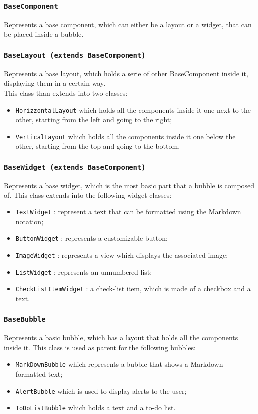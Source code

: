 \subsubsection{\texttt{BaseComponent}}
Represents a base component, which can either be a layout or a widget, that can be placed inside a bubble.

\subsubsection{\texttt{BaseLayout (extends BaseComponent)}}
Represents a base layout, which holds a serie of other BaseComponent inside it, displaying them in a certain way. \\
This class than extends into two classes:
\begin{itemize}
	\item \texttt{HorizzontalLayout} which holds all the components inside it one next to the other, starting from the left and going to the right;
	\item \texttt{VerticalLayout} which holds all the components inside it one below the other, starting from the top and going to the bottom.
\end{itemize}


\subsubsection{\texttt{BaseWidget (extends BaseComponent)}}
Represents a base widget, which is the most basic part that a bubble is composed of.
This class extends into the following widget classes:
\begin{itemize}
	\item \texttt{TextWidget} : represent a text that can be formatted using the Markdown notation;
	\item \texttt{ButtonWidget} : represents a customizable button;
	\item \texttt{ImageWidget} : represents a view which displays the associated image;
	\item \texttt{ListWidget} : represents an unnumbered list;
	\item \texttt{CheckListItemWidget} : a check-list item, which is made of a checkbox and a text.
\end{itemize}

\subsubsection{\texttt{BaseBubble}}
Represents a basic bubble, which has a layout that holds all the components inside it.
This class is used as parent for the following bubbles:
\begin{itemize}
	\item \texttt{MarkDownBubble} which represents a bubble that shows a Markdown-formatted text;
	\item \texttt{AlertBubble} which is used to display alerts to the user;
	\item \texttt{ToDoListBubble} which holds a text and a to-do list.
\end{itemize}

\newpage






